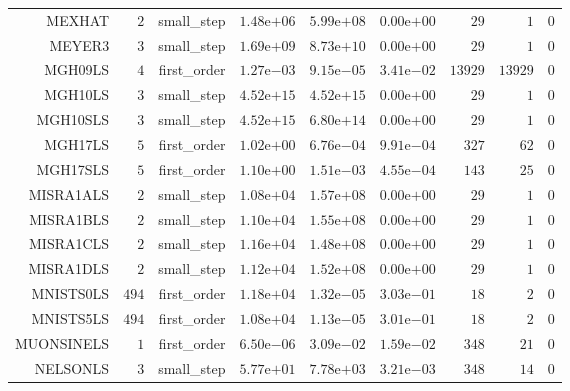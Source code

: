 \begin{longtable}{rrrrrrrrr}
MEXHAT & \(     2\) & small\_step & \( 1.48\)e\(+06\) & \( 5.99\)e\(+08\) & \( 0.00\)e\(+00\) & \(    29\) & \(     1\) & \(     0\) \\
MEYER3 & \(     3\) & small\_step & \( 1.69\)e\(+09\) & \( 8.73\)e\(+10\) & \( 0.00\)e\(+00\) & \(    29\) & \(     1\) & \(     0\) \\
MGH09LS & \(     4\) & first\_order & \( 1.27\)e\(-03\) & \( 9.15\)e\(-05\) & \( 3.41\)e\(-02\) & \( 13929\) & \( 13929\) & \(     0\) \\
MGH10LS & \(     3\) & small\_step & \( 4.52\)e\(+15\) & \( 4.52\)e\(+15\) & \( 0.00\)e\(+00\) & \(    29\) & \(     1\) & \(     0\) \\
MGH10SLS & \(     3\) & small\_step & \( 4.52\)e\(+15\) & \( 6.80\)e\(+14\) & \( 0.00\)e\(+00\) & \(    29\) & \(     1\) & \(     0\) \\
MGH17LS & \(     5\) & first\_order & \( 1.02\)e\(+00\) & \( 6.76\)e\(-04\) & \( 9.91\)e\(-04\) & \(   327\) & \(    62\) & \(     0\) \\
MGH17SLS & \(     5\) & first\_order & \( 1.10\)e\(+00\) & \( 1.51\)e\(-03\) & \( 4.55\)e\(-04\) & \(   143\) & \(    25\) & \(     0\) \\
MISRA1ALS & \(     2\) & small\_step & \( 1.08\)e\(+04\) & \( 1.57\)e\(+08\) & \( 0.00\)e\(+00\) & \(    29\) & \(     1\) & \(     0\) \\
MISRA1BLS & \(     2\) & small\_step & \( 1.10\)e\(+04\) & \( 1.55\)e\(+08\) & \( 0.00\)e\(+00\) & \(    29\) & \(     1\) & \(     0\) \\
MISRA1CLS & \(     2\) & small\_step & \( 1.16\)e\(+04\) & \( 1.48\)e\(+08\) & \( 0.00\)e\(+00\) & \(    29\) & \(     1\) & \(     0\) \\
MISRA1DLS & \(     2\) & small\_step & \( 1.12\)e\(+04\) & \( 1.52\)e\(+08\) & \( 0.00\)e\(+00\) & \(    29\) & \(     1\) & \(     0\) \\
MNISTS0LS & \(   494\) & first\_order & \( 1.18\)e\(+04\) & \( 1.32\)e\(-05\) & \( 3.03\)e\(-01\) & \(    18\) & \(     2\) & \(     0\) \\
MNISTS5LS & \(   494\) & first\_order & \( 1.08\)e\(+04\) & \( 1.13\)e\(-05\) & \( 3.01\)e\(-01\) & \(    18\) & \(     2\) & \(     0\) \\
MUONSINELS & \(     1\) & first\_order & \( 6.50\)e\(-06\) & \( 3.09\)e\(-02\) & \( 1.59\)e\(-02\) & \(   348\) & \(    21\) & \(     0\) \\
NELSONLS & \(     3\) & small\_step & \( 5.77\)e\(+01\) & \( 7.78\)e\(+03\) & \( 3.21\)e\(-03\) & \(   348\) & \(    14\) & \(     0\) \\

\end{longtable}
